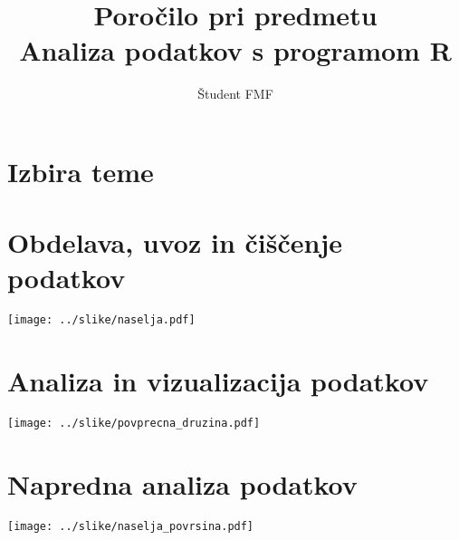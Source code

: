\documentclass[11pt,a4paper]{article}
\begin{document}
\title{Poročilo pri predmetu \\
Analiza podatkov s programom R}
\author{Študent FMF}
\maketitle

\section{Izbira teme}

\section{Obdelava, uvoz in čiščenje podatkov}

\texttt{[image: ../slike/naselja.pdf]}

\section{Analiza in vizualizacija podatkov}

\texttt{[image: ../slike/povprecna\_druzina.pdf]}

\section{Napredna analiza podatkov}

\texttt{[image: ../slike/naselja\_povrsina.pdf]}
\end{document}
